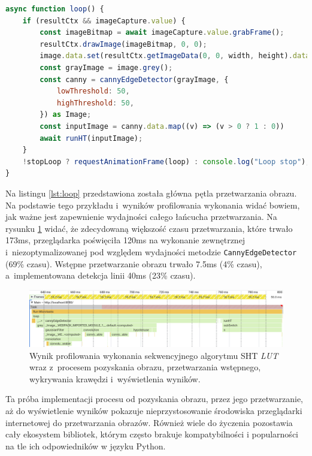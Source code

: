 \begin{lstlisting}[language=JavaScript, float=ht, label=lst:loop, caption=Funkcja przetwarzająca w~pętli kolejne klatki obrazu z~kamery.]
async function loop() {
    if (resultCtx && imageCapture.value) {
        const imageBitmap = await imageCapture.value.grabFrame();
        resultCtx.drawImage(imageBitmap, 0, 0);
        image.data.set(resultCtx.getImageData(0, 0, width, height).data);
        const grayImage = image.grey();
        const canny = cannyEdgeDetector(grayImage, {
            lowThreshold: 50,
            highThreshold: 50,
        }) as Image;
        const inputImage = canny.data.map((v) => (v > 0 ? 1 : 0))
        await runHT(inputImage);
    }
    !stopLoop ? requestAnimationFrame(loop) : console.log("Loop stop");
}
\end{lstlisting}

Na listingu \ref{lst:loop} przedstawiona została główna pętla przetwarzania obrazu. Na podstawie tego przykładu i~wyników profilowania wykonania widać bowiem, jak ważne jest zapewnienie wydajności całego łańcucha przetwarzania. Na rysunku \ref{fig:road-profiler} widać, że zdecydowaną większość czasu przetwarzania, które trwało 173ms, przeglądarka poświęciła 120ms na wykonanie zewnętrznej i~niezoptymalizowanej pod względem wydajności metodzie \lstinline{CannyEdgeDetector} (69\% czasu). Wstępne przetwarzanie obrazu trwało 7.5ms (4\% czasu), a~implementowana detekcja linii 40ms (23\% czasu).

\begin{figure}[h]
    \centering
    \includegraphics[width=\linewidth]{img/road-profiler.png}
    \caption{Wynik profilowania wykonania sekwencyjnego algorytmu SHT \textit{LUT} wraz z~procesem pozyskania obrazu, przetwarzania wstępnego, wykrywania krawędzi i~wyświetlenia wyników.}
    \label{fig:road-profiler}
\end{figure}

Ta próba implementacji procesu od pozyskania obrazu, przez jego przetwarzanie, aż do wyświetlenie wyników pokazuje nieprzystosowanie środowiska przeglądarki internetowej do przetwarzania obrazów. Również wiele do życzenia pozostawia cały ekosystem bibliotek, którym często brakuje kompatybilności i popularności na tle ich odpowiedników w języku Python. 
